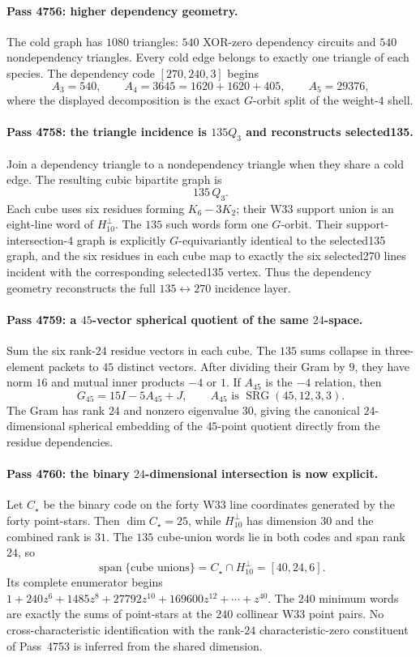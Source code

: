 \paragraph{Pass 4756: higher dependency geometry.}
The cold graph has $1080$ triangles: $540$ XOR-zero dependency circuits and
$540$ nondependency triangles.  Every cold edge belongs to exactly one triangle
of each species.  The dependency code $[270,240,3]$ begins
\[
 A_3=540,\qquad A_4=3645=1620+1620+405,\qquad A_5=29376,
\]
where the displayed decomposition is the exact $G$-orbit split of the weight-$4$
shell.

\paragraph{Pass 4758: the triangle incidence is $135Q_3$ and reconstructs selected135.}
Join a dependency triangle to a nondependency triangle when they share a cold
edge.  The resulting cubic bipartite graph is
\[
 \boxed{135\,Q_3}.
\]
Each cube uses six residues forming $K_6-3K_2$; their W33 support union is an
eight-line word of $H_{10}^{\perp}$.  The $135$ such words form one
$G$-orbit.  Their support-intersection-$4$ graph is explicitly
$G$-equivariantly identical to the selected135 graph, and the six residues in
each cube map to exactly the six selected270 lines incident with the
corresponding selected135 vertex.  Thus the dependency geometry reconstructs
the full $135\leftrightarrow270$ incidence layer.

\paragraph{Pass 4759: a $45$-vector spherical quotient of the same $24$-space.}
Sum the six rank-$24$ residue vectors in each cube.  The $135$ sums collapse in
three-element packets to $45$ distinct vectors.  After dividing their Gram by
$9$, they have norm $16$ and mutual inner products $-4$ or $1$.  If $A_{45}$
is the $-4$ relation, then
\[
 \boxed{G_{45}=15I-5A_{45}+J},
 \qquad A_{45}\text{ is }\operatorname{SRG}(45,12,3,3).
\]
The Gram has rank $24$ and nonzero eigenvalue $30$, giving the canonical
$24$-dimensional spherical embedding of the $45$-point quotient directly from
the residue dependencies.

\paragraph{Pass 4760: the binary $24$-dimensional intersection is now explicit.}
Let $C_\star$ be the binary code on the forty W33 line coordinates generated by
the forty point-stars.  Then $\dim C_\star=25$, while
$H_{10}^{\perp}$ has dimension $30$ and the combined rank is $31$.  The $135$
cube-union words lie in both codes and span rank $24$, so
\[
 \boxed{\operatorname{span}\{\text{cube unions}\}
 =C_\star\cap H_{10}^{\perp}=[40,24,6].}
\]
Its complete enumerator begins
$1+240z^6+1485z^8+27792z^{10}+169600z^{12}+\cdots+z^{40}$.
The $240$ minimum words are exactly the sums of point-stars at the $240$
collinear W33 point pairs.  No cross-characteristic identification with the
rank-$24$ characteristic-zero constituent of Pass~4753 is inferred from the
shared dimension.

